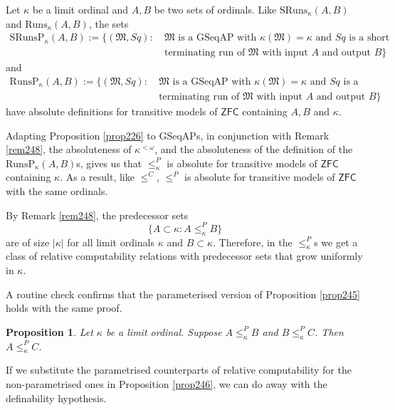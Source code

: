 \documentclass[12pt, twoside]{memoir}
\numberwithin{equation}{section}
\newtheorem{prop}[thm]{Proposition}
\theoremstyle{definition}
\theoremstyle{remark}
\theoremstyle{definition}
\theoremstyle{definition}
\theoremstyle{definition}
\theoremstyle{remark}
\begin{document}
Let $\kappa$ be a limit ordinal and $A, B$ be two sets of ordinals. Like $\mathrm{SRuns}_{\kappa}(A, B)$ and $\mathrm{Runs}_{\kappa}(A, B)$, the sets
\begin{align*}
    \mathrm{SRunsP}_{\kappa}(A, B) := \{(\mathfrak{M}, Sq) : \ & \mathfrak{M} \text{ is a GSeqAP with } \kappa(\mathfrak{M}) = \kappa \text{ and } Sq \text{ is a short} \\
    & \text{terminating run of } \mathfrak{M} \text{ with input } A \text{ and output } B\}
\end{align*}
and
\begin{align*}
    \mathrm{RunsP}_{\kappa}(A, B) := \{(\mathfrak{M}, Sq) : \ & \mathfrak{M} \text{ is a GSeqAP with } \kappa(\mathfrak{M}) = \kappa \text{ and } Sq \text{ is a} \\
    & \text{terminating run of } \mathfrak{M} \text{ with input } A \text{ and output } B\}
\end{align*}
have absolute definitions for transitive models of $\mathsf{ZFC}$ containing $A, B$ and $\kappa$. 

Adapting Proposition \ref{prop226} to GSeqAPs, in conjunction with Remark \ref{rem248}, the absoluteness of $\kappa^{< \omega}$, and the absoluteness of the definition of the $\mathrm{RunsP}_{\kappa}(A, B)$s, gives us that $\leq^P_{\kappa}$ is absolute for transitive models of $\mathsf{ZFC}$ containing $\kappa$. As a result, like $\leq^C$, $\leq^P$ is absolute for transitive models of $\mathsf{ZFC}$ with the same ordinals. 

By Remark \ref{rem248}, the predecessor sets
\begin{equation*}
    \{A \subset \kappa : A \leq^P_{\kappa} B\}
\end{equation*}
are of size $|\kappa|$ for all limit ordinals $\kappa$ and $B \subset \kappa$. Therefore, in the $\leq^P_{\kappa}$s we get a class of relative computability relations with predecessor sets that grow uniformly in $\kappa$.

A routine check confirms that the parameterised version of Proposition \ref{prop245} holds with the same proof.

\begin{prop}\label{prop251}
Let $\kappa$ be a limit ordinal. Suppose $A \leq^P_{\kappa} B$ and $B \leq^P_{\kappa} C$. Then $A \leq^P_{\kappa} C$.
\end{prop}

If we substitute the parametrised counterparts of relative computability for the non-parametrised ones in Proposition \ref{prop246}, we can do away with the definability hypothesis.
\end{document}
